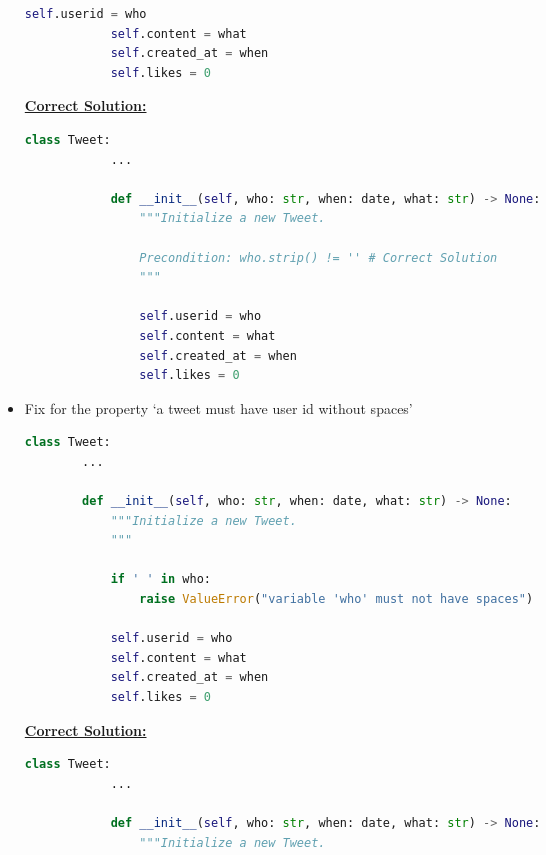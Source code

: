 \documentclass[12pt]{article}
\begin{document}
\begin{itemize}
\begin{lstlisting}[language=Python]
            self.userid = who
            self.content = what
            self.created_at = when
            self.likes = 0
    \end{lstlisting}

    \bigskip

    \begin{mdframed}
        \underline{\textbf{Correct Solution:}}

        \bigskip

        \begin{lstlisting}[language=Python]
        class Tweet:
            ...

            def __init__(self, who: str, when: date, what: str) -> None:
                """Initialize a new Tweet.

                Precondition: who.strip() != '' # Correct Solution
                """

                self.userid = who
                self.content = what
                self.created_at = when
                self.likes = 0
        \end{lstlisting}
    \end{mdframed}

    \item Fix for the property `a tweet must have user id without spaces'

    \begin{lstlisting}[language=Python]
    class Tweet:
        ...

        def __init__(self, who: str, when: date, what: str) -> None:
            """Initialize a new Tweet.
            """

            if ' ' in who:
                raise ValueError("variable 'who' must not have spaces")

            self.userid = who
            self.content = what
            self.created_at = when
            self.likes = 0
    \end{lstlisting}

    \bigskip

    \begin{mdframed}
        \underline{\textbf{Correct Solution:}}

        \bigskip

        \begin{lstlisting}[language=Python]
        class Tweet:
            ...

            def __init__(self, who: str, when: date, what: str) -> None:
                """Initialize a new Tweet.


\end{lstlisting}
\end{mdframed}
\end{itemize}
\end{document}
